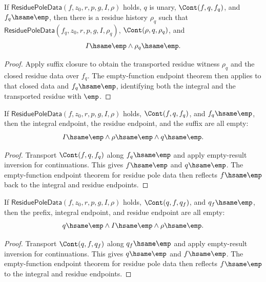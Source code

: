 \begin{theorem}
\label{thm:residue-pole-data-suffix-closure-empty-function-endpoints}
If $\mathsf{ResiduePoleData}(f,z_0,r,p,g,I,\rho)$ holds, $q$ is unary,
$\Cont(f,q,f_q)$, and $f_q\hsame\emp$, then there is a residue history
$\rho_q$ such that $\mathsf{ResiduePoleData}(f_q,z_0,r,p,g,I,\rho_q)$,
$\Cont(\rho,q,\rho_q)$, and
$$
I\hsame\emp\land \rho_q\hsame\emp.
$$
\end{theorem}
\begin{proof}
Apply suffix closure to obtain the transported residue witness $\rho_q$ and
the closed residue data over $f_q$. The empty-function endpoint theorem then
applies to that closed data and $f_q\hsame\emp$, identifying both the integral
and the transported residue with $\emp$.
\end{proof}

\begin{theorem}
\label{thm:residue-pole-data-empty-suffix-reflects-endpoints}
If $\mathsf{ResiduePoleData}(f,z_0,r,p,g,I,\rho)$ holds, $\Cont(f,q,f_q)$,
and $f_q\hsame\emp$, then the integral endpoint, the residue endpoint, and the
suffix are all empty:
$$
I\hsame\emp\land \rho\hsame\emp\land q\hsame\emp.
$$
\end{theorem}
\begin{proof}
Transport $\Cont(f,q,f_q)$ along $f_q\hsame\emp$ and apply empty-result
inversion for continuations. This gives $f\hsame\emp$ and $q\hsame\emp$.
The empty-function endpoint theorem for residue pole data then reflects
$f\hsame\emp$ back to the integral and residue endpoints.
\end{proof}

\begin{theorem}
\label{thm:residue-pole-data-prefix-empty-reflects-endpoints}
If $\mathsf{ResiduePoleData}(f,z_0,r,p,g,I,\rho)$ holds, $\Cont(q,f,q_f)$,
and $q_f\hsame\emp$, then the prefix, integral endpoint, and residue endpoint
are all empty:
$$
q\hsame\emp\land I\hsame\emp\land \rho\hsame\emp.
$$
\end{theorem}
\begin{proof}
Transport $\Cont(q,f,q_f)$ along $q_f\hsame\emp$ and apply empty-result
inversion for continuations. This gives $q\hsame\emp$ and $f\hsame\emp$.
The empty-function endpoint theorem for residue pole data then reflects
$f\hsame\emp$ to the integral and residue endpoints.
\end{proof}

